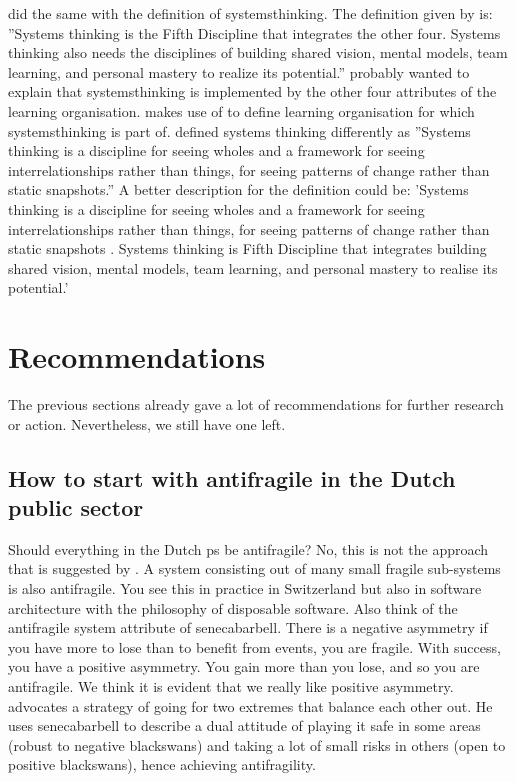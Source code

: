 \Textcite{Botjes2021} did the same with the definition of \gls{systemsthinking}. The definition given by \textcite{Botjes2021} is: ''Systems thinking is the Fifth Discipline that integrates the other four. Systems thinking also needs the disciplines of building shared vision, mental models, team learning, and personal mastery to realize its potential.'' \textcite{Botjes2021} probably wanted to explain that \gls{systemsthinking} is implemented by the other four \glspl{attribute} of the learning organisation.  \textcite{Botjes2021} makes use of \textcite{Senge1994} to define learning organisation for which \gls{systemsthinking} is part of. \textcite{Senge1994} defined systems thinking differently as ''Systems thinking is a discipline for seeing wholes and a framework for seeing interrelationships rather than things, for seeing patterns of change rather than static snapshots.'' A better description for the definition could be: 'Systems thinking is a discipline for seeing wholes and a framework for seeing interrelationships rather than things, for seeing patterns of change rather than static snapshots \parencite{Senge1994}. Systems thinking is \textcite{Senge1994} Fifth Discipline that integrates building shared vision, mental models, team learning, and personal mastery to realise its potential.'

\section{Recommendations}
\label{sec:reccomandations}
The previous sections already gave a lot of recommendations for further research or action. Nevertheless, we still have one left.

\subsection{How to start with antifragile in the Dutch public sector}
\label{sub:howtostart}
Should everything in the Dutch \gls{ps} be \gls{antifragile}? No, this is not the approach that is suggested by \textcite{Taleb2012}. A system consisting out of many small \gls{fragile} sub-systems is also \gls{antifragile}. You see this in practice in Switzerland but also in software architecture with the philosophy of disposable software. Also think of the \gls{antifragile} system \gls{attribute} of \gls{senecabarbell}. There is a negative asymmetry if you have more to lose than to benefit from events, you are fragile. With success, you have a positive asymmetry. You gain more than you lose, and so you are \gls{antifragile}. We think it is evident that we really like positive asymmetry. \textcite{Taleb2012} advocates a strategy of going for two extremes that balance each other out. He uses \gls{senecabarbell} to describe a dual attitude of playing it safe in some areas (robust to negative \glspl{blackswan}) and taking a lot of small risks in others (open to positive \glspl{blackswan}), hence achieving \gls{antifragility}.

